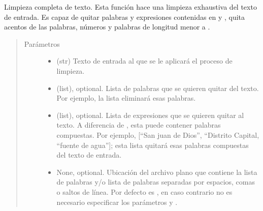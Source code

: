 \documentclass[letterpaper,10pt,openany,spanish]{sphinxmanual}
\begin{document}
\begin{fulllineitems}
\label{\detokenize{funciones/limpieza:limpieza.limpieza_texto}}
Limpieza completa de texto. Esta función hace una limpieza exhaustiva del texto de entrada.     Es capaz de quitar palabras y expresiones contenidas en  y ,     quita acentos de las palabras, números y palabras de longitud menor a .
\begin{quote}\begin{description}
\item[{Parámetros}] \leavevmode\begin{itemize}
\item {} 
 \textendash{} (str) Texto de entrada al que se le aplicará el proceso de limpieza.

\item {} 
 \textendash{} (list), optional. Lista de palabras que se quieren quitar del texto. Por ejemplo,         la lista \sphinxtitleref{{[}“hola”, “de”, “a”{]}} eliminará esas palabras.

\item {} 
 \textendash{} (list), optional. Lista de expresiones que se quieren quitar al texto.         A diferencia de , esta puede contener palabras compuestas. Por ejemplo,         {[}“San juan de Dios”, “Distrito Capital, “fuente de agua”{]}; esta lista quitará esas palabras         compuestas del texto de entrada.

\item {} 
 \textendash{} None, optional. Ubicación del archivo plano que contiene la lista de palabras         y/o lista de palabras separadas por espacios, comas o saltos de línea. Por defecto es , en         caso contrario no es necesario especificar los parámetros  y .


\end{itemize}
\end{description}
\end{quote}
\end{fulllineitems}
\end{document}
